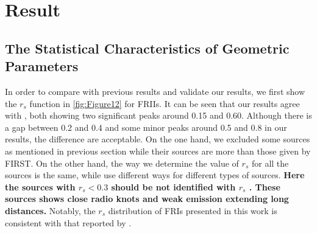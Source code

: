 \documentclass{aa}
\begin{document}
  


   \maketitle


\section{Result}\label{sec:Result}    
\subsection{The Statistical Characteristics of Geometric Parameters}\label{sec:Section4_1}

In order to compare with previous results and validate our results, we first show the $r_s$ function in \autoref{fig:Figure12} for FRIIs. 
It can be seen that our results agree with \citet{lin_populations_2010}, both showing two significant peaks around 0.15 and 0.60. 
Although there is a gap between 0.2 and 0.4 and some minor peaks around 0.5 and 0.8 in our results, the difference are acceptable. On the one hand, we excluded some sources as mentioned in previous section while their sources are more than those given by FIRST. On the other hand, the way we determine the value of $r_s$ for all the sources is the same, while \citet{lin_populations_2010} use different ways for different types of sources.
\textbf{Here the sources with $r_s<0.3$ should be not identified with $r_s$ \citep{}. These sources shows close radio knots and weak emission extending long distances.}
Notably, the $r_s$ distribution of FRIs presented in this work is consistent with that reported by \citet{lin_populations_2010}.

\end{document}
